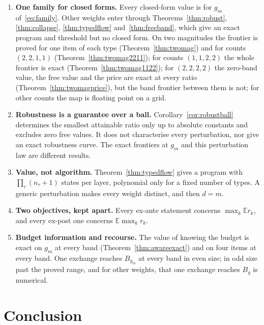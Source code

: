 \begin{enumerate}
\item[1)] \textbf{One family for closed forms.} Every closed-form value is for $g_{m}$
of~\eqref{eq:family}. Other weights enter through Theorems~\ref{thm:robust},
\ref{thm:collapse}, \ref{thm:typedflow} and~\ref{thm:freeband}, which give an exact program
and threshold but no closed form. On two magnitudes the frontier is proved for one item of each
type (Theorem~\ref{thm:twomag}) and for counts $(2,2,1,1)$ (Theorem~\ref{thm:twomag2211}); for
counts $(1,1,2,2)$ the whole frontier is exact (Theorem~\ref{thm:twomag1122}); for $(2,2,2,2)$ the
zero-band value, the free value and the price are exact at every ratio
(Theorem~\ref{thm:twomagprice}), but the band frontier between them is not; for other counts the
map is floating point on a grid.
\item[2)] \textbf{Robustness is a guarantee over a ball.} Corollary~\ref{cor:robustball}
determines the smallest attainable ratio only up to absolute constants and excludes zero
free values. It does not characterise every perturbation, nor give an exact robustness curve.
The exact frontiers at $g_m$ and this perturbation law are different results.
\item[3)] \textbf{Value, not algorithm.} Theorem~\ref{thm:typedflow} gives a program with
$\prod_\tau(n_\tau+1)$ states per layer, polynomial only for a fixed number of types. A generic
perturbation makes every weight distinct, and then $d=m$.
\item[4)] \textbf{Two objectives, kept apart.} Every ex-ante statement concerns
$\max_{k}\mathbb{E}r_{k}$, and every ex-post one concerns $\mathbb{E}\max_{k}r_{k}$.
\item[5)] \textbf{Budget information and recourse.} The value of knowing the budget is exact on
$g_m$ at every band (Theorem~\ref{thm:awareexact}) and on four items at every band. One exchange
reaches $B_{g_m}$ at every band in even size; in odd size past the proved range, and for other
weights, that one exchange reaches $B_g$ is numerical.
\end{enumerate}

\section{Conclusion}

